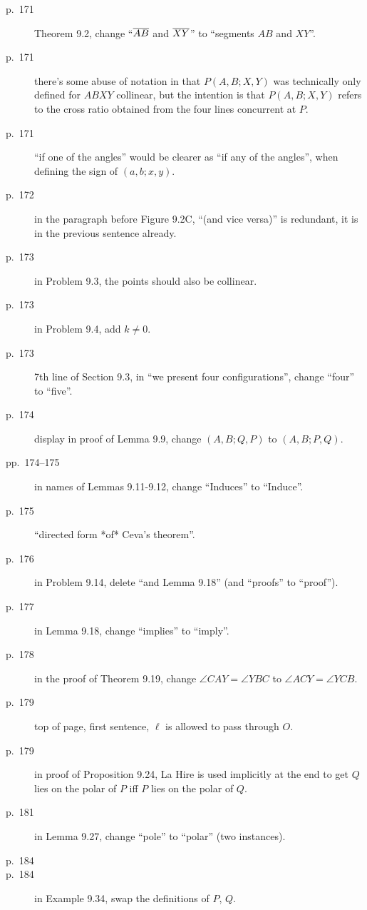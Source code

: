 \documentclass[11pt]{scrartcl}
\begin{document}
\begin{description}
\item[p.\  171] Theorem 9.2, change ``$\overline{AB}$ and $\overline{XY}$'' to ``segments $AB$ and $XY$''.
\item[p.\  171] there's some abuse of notation in that $P(A,B;X,Y)$
  was technically only defined for $ABXY$ collinear,
  but the intention is that $P(A,B;X,Y)$ refers to the cross ratio obtained
  from the four lines concurrent at $P$.
\item[p.\  171] ``if one of the angles'' would be clearer as ``if any of the
  angles'', when defining the sign of $(a,b;x,y)$.
\item[p.\  172] in the paragraph before Figure 9.2C,
  ``(and vice versa)'' is redundant, it is in the previous sentence already.
\item[p.\  173] in Problem 9.3, the points should also be collinear.
\item[p.\  173] in Problem 9.4, add $k \neq 0$.
\item[p.\  173] 7th line of Section 9.3, in ``we present four configurations'',
  change ``four'' to ``five''.
\item[p.\  174] display in proof of Lemma 9.9, change $(A,B;Q,P)$ to $(A,B;P,Q)$.
\item[pp.\  174--175] in names of Lemmas 9.11-9.12,
  change ``Induces'' to ``Induce''.
\item[p.\  175] ``directed form *of* Ceva's theorem''.
\item[p.\  176] in Problem 9.14, delete ``and Lemma 9.18'' (and ``proofs'' to ``proof'').
\item[p.\  177] in Lemma 9.18, change ``implies'' to ``imply''.
\item[p.\  178] in the proof of Theorem 9.19, change $\angle CAY = \angle YBC$ to $\angle ACY = \angle YCB$.
\item[p.\  179] top of page, first sentence, $\ell$ is allowed to pass through $O$.
\item[p.\  179] in proof of Proposition 9.24, La Hire is used implicitly at the end
  to get $Q$ lies on the polar of $P$ iff $P$ lies on the polar of $Q$.
\item[p.\  181] in Lemma 9.27, change ``pole'' to ``polar'' (two instances).
\item[p.\  184] 
\item[p.\  184] in Example 9.34, swap the definitions of $P$, $Q$.

\end{description}
\end{document}
